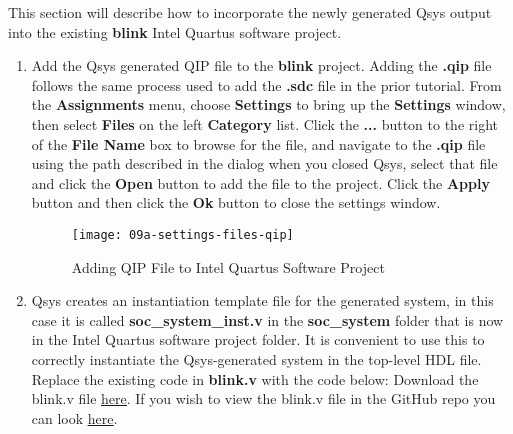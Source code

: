 \begin{flushleft}
\noindent

This section will describe how to incorporate the newly generated Qsys output into the existing \textbf{blink} Intel Quartus software project.

\begin{enumerate}[
	label=\textbf{Step \arabic*.},
	leftmargin=*,
	widest={00},
	align=left]

\item Add the Qsys generated QIP file to the \textbf{blink} project.  Adding the \textbf{.qip} file follows the same process used to add the \textbf{.sdc} file in the prior tutorial.  From the \textbf{Assignments} menu, choose \textbf{Settings} to bring up the \textbf{Settings} window, then select \textbf{Files} on the left \textbf{Category} list.  Click the \textbf{...} button to the right of the \textbf{File Name} box to browse for the file, and navigate to the \textbf{.qip} file using the path described in the dialog when you closed Qsys, select that file and click the \textbf{Open} button to add the file to the project.  Click the \textbf{Apply} button and then click the \textbf{Ok} button to close the settings window.

\begin{figure}[H]
\centering
\texttt{[image: 09a-settings-files-qip]}
\caption{Adding QIP File to Intel Quartus Software Project}
\label{fig:09a-settings-files-qip}
\end{figure}

\item Qsys creates an instantiation template file for the generated system, in this case it is called \textbf{soc\_\allowbreak system\_\allowbreak inst.v} in the \textbf{soc\_system} folder that is now in the Intel Quartus software project folder.  It is convenient to use this to correctly instantiate the Qsys-generated system in the top-level HDL file.  Replace the existing code in \textbf{blink.v} with the code below:
\newline
\newline
Download the blink.v file \href{\TheRawURL/MyFirstQsysSystem/hdl_src/blink.v}{\underline{here}}.
\newline
If you wish to view the blink.v file in the GitHub repo you can look \href{\TheBlobURL/MyFirstQsysSystem/hdl_src/blink.v}{\underline{here}}.


\end{enumerate}
\end{flushleft}

